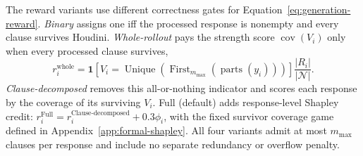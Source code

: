 The reward variants use different correctness gates for
Equation~\ref{eq:generation-reward}.  \emph{Binary} assigns one
iff the processed response is nonempty and every clause survives Houdini.
\emph{Whole-rollout} pays the strength score
\(\operatorname{cov}(V_i)\) only when every processed clause survives,
\[
  r_i^{\mathrm{whole}}
  =\mathbf 1[V_i=
    \operatorname{Unique}(\operatorname{First}_{m_{\max}}(
      \operatorname{parts}(y_i)))]
   \frac{|R_i|}{|\mathcal N|}.
\]
\emph{Clause-decomposed} removes this all-or-nothing indicator and scores
each response by the coverage of its surviving \(V_i\).  Full (default)
adds response-level
Shapley credit: \(r_i^{\mathrm{Full}}=r_i^{\text{Clause-decomposed}}+0.3\phi_i\),
with the fixed survivor coverage game defined in
Appendix~\ref{app:formal-shapley}.
All four variants admit at most \(m_{\max}\) clauses per response and include
no separate redundancy or overflow penalty.
